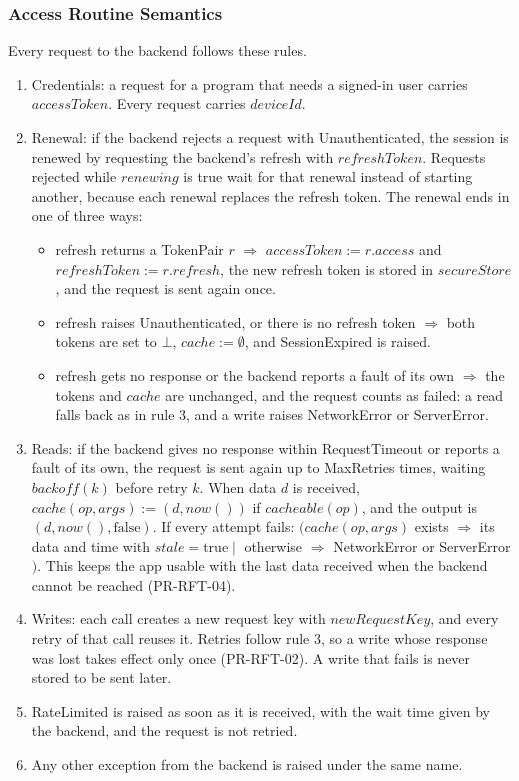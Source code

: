 \documentclass[12pt, titlepage]{article}
\begin{document}
\subsubsection{Access Routine Semantics}

\noindent Every request to the backend follows these rules.

\begin{enumerate}
\item Credentials: a request for a program that needs a signed-in user
  carries $\mathit{accessToken}$. Every request carries $\mathit{deviceId}$.
\item Renewal: if the backend rejects a request with Unauthenticated, the
  session is renewed by requesting the backend's refresh with
  $\mathit{refreshToken}$. Requests rejected while $\mathit{renewing}$ is
  true wait for that renewal instead of starting another, because each
  renewal replaces the refresh token. The renewal ends in one of three ways:
  \begin{itemize}
  \item refresh returns a TokenPair $r$ $\Rightarrow$ $\mathit{accessToken}
    := r.\mathit{access}$ and $\mathit{refreshToken} := r.\mathit{refresh}$,
    the new refresh token is stored in $\mathit{secureStore}$, and the
    request is sent again once.
  \item refresh raises Unauthenticated, or there is no refresh token
    $\Rightarrow$ both tokens are set to $\bot$, $\mathit{cache} :=
    \emptyset$, and SessionExpired is raised.
  \item refresh gets no response or the backend reports a fault of its own
    $\Rightarrow$ the tokens and $\mathit{cache}$ are unchanged, and the
    request counts as failed: a read falls back as in rule 3, and a write
    raises NetworkError or ServerError.
  \end{itemize}
\item Reads: if the backend gives no response within
  \textsf{RequestTimeout} or reports a fault of its own, the request is sent
  again up to \textsf{MaxRetries} times, waiting $\mathit{backoff}(k)$ before
  retry $k$. When data $d$ is received, $\mathit{cache}(\mathit{op},
  \mathit{args}) := (d, \mathit{now}())$ if $\mathit{cacheable}(\mathit{op})$,
  and the output is $(d, \mathit{now}(), \mathrm{false})$. If every attempt
  fails: $(\mathit{cache}(\mathit{op}, \mathit{args})$ exists $\Rightarrow$
  its data and time with $\mathit{stale} = \mathrm{true} \mid$ otherwise
  $\Rightarrow$ NetworkError or ServerError$)$. This keeps the app usable
  with the last data received when the backend cannot be reached (PR-RFT-04).
\item Writes: each call creates a new request key with
  $\mathit{newRequestKey}$, and every retry of that call reuses it. Retries
  follow rule 3, so a write whose response was lost takes effect only once
  (PR-RFT-02). A write that fails is never stored to be sent later.
\item RateLimited is raised as soon as it is received, with the wait time
  given by the backend, and the request is not retried.
\item Any other exception from the backend is raised under the same name.
\end{enumerate}
\end{document}
